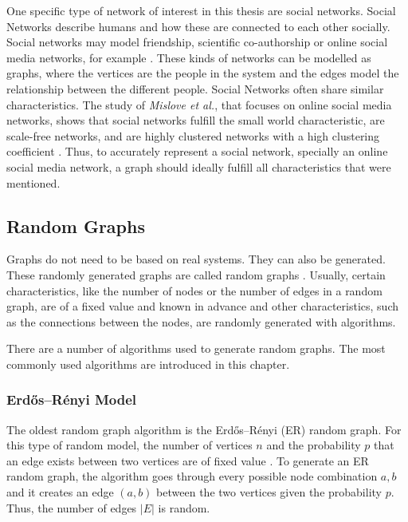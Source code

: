 One specific type of network of interest in this thesis are social networks.
Social Networks describe humans and 
how these are connected to each other socially. Social networks
may model friendship, scientific co-authorship or online social media networks, 
for example \cite{basicnetwork}. 
These kinds of networks can be modelled as graphs, where the vertices are the
people in the system and the edges model the relationship between the 
different people.
Social Networks often share similar characteristics. The study of 
\textit{Mislove et al.}, that focuses on online social media networks,
shows that social networks fulfill the small world characteristic,
are scale-free networks, and
are highly clustered networks with a high clustering coefficient
\cite{mislovesocialnetworkcharacteristics}. Thus, to accurately represent 
a social  network, specially an  online social media network, 
a graph should ideally fulfill all characteristics that were mentioned.

\subsection{Random Graphs}

Graphs do not need to be based on real systems. They can also be generated. 
These randomly generated graphs are called random graphs \cite{randomgraphs}.
Usually, certain characteristics, like the number of nodes or the number 
of edges in a random graph, are of a fixed value
and known in advance and other characteristics, such as the connections between 
the nodes, are randomly generated with algorithms.

There are a number of algorithms used to generate random graphs.
The most commonly used algorithms are introduced in this chapter.

\subsubsection{Erdős–Rényi Model}

The oldest random graph algorithm is the 
Erdős–Rényi (ER) random graph. For this type of random model, the
number of vertices $n$ and the probability $p$ that an 
edge exists between two vertices are of fixed value \cite{basicnetwork}. 
To generate an ER random graph, the algorithm goes through 
every possible node combination $a, b$ and it creates an edge 
$(a, b)$ between the two vertices given the probability $p$. 
Thus, the number of edges $|E|$ is random.

